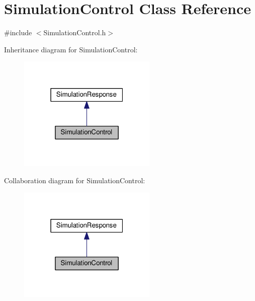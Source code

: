 \hypertarget{class_simulation_control}{}\section{Simulation\+Control Class Reference}
\label{class_simulation_control}


{\ttfamily \#include $<$Simulation\+Control.\+h$>$}



Inheritance diagram for Simulation\+Control\+:\nopagebreak
\begin{figure}[H]
\begin{center}
\leavevmode
\includegraphics[width=187pt]{class_simulation_control__inherit__graph}
\end{center}
\end{figure}


Collaboration diagram for Simulation\+Control\+:\nopagebreak
\begin{figure}[H]
\begin{center}
\leavevmode
\includegraphics[width=187pt]{class_simulation_control__coll__graph}
\end{center}
\end{figure}
